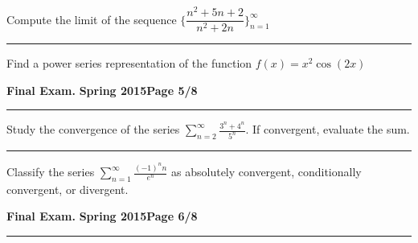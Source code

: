 \documentclass[12pt]{article}
\theoremstyle{definition}
\begin{document}
{{ Compute the limit of the sequence $\bigg\{
\dfrac{n^2+5n+2}{n^2+2n} \bigg\}_{n=1}^\infty$}
\vspace{4cm}
\begin{flushright}
\end{flushright}
\hrule

{\problem[5 pts] Find a power series representation of the function $f(x) = x^2 \cos (2x)$}
\vspace{5cm}
\begin{flushright}
\end{flushright}

\newpage

\hfill{\large\bf Final Exam.}\hfill{\large\bf
  Spring 2015}\hfill{\large\bf Page 5/8}\hrule
  
\bigskip

{\problem[10 pts] Study the convergence of the series
  $\displaystyle{\sum_{n=2}^\infty \frac{3^n+4^n}{5^n}}$.  If
  convergent, evaluate the sum.
\vspace{6.5cm}
\begin{flushright}
\end{flushright}
\hrule
{\problem[10 pts] Classify the series $\displaystyle{\sum_{n=1}^\infty
    \frac{(-1)^n n}{e^n}}$ as absolutely
  convergent, conditionally convergent, or divergent.}
\vspace{6.5cm}
\begin{flushright}
\end{flushright}
\newpage

\hfill{\large\bf Final Exam.}\hfill{\large\bf
  Spring 2015}\hfill{\large\bf Page 6/8}\hrule

}}
\end{document}

